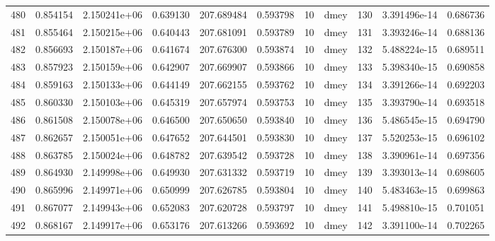 \begin{tabular}{lrrrrrrlrrr}
480  &    0.854154 &        2.150241e+06 &  0.639130 &              207.689484 &    0.593798 &      10 &         dmey &    130 &   3.391496e-14 &      0.686736 \\
481  &    0.855464 &        2.150215e+06 &  0.640443 &              207.681091 &    0.593789 &      10 &         dmey &    131 &   3.393246e-14 &      0.688136 \\
482  &    0.856693 &        2.150187e+06 &  0.641674 &              207.676300 &    0.593874 &      10 &         dmey &    132 &   5.488224e-15 &      0.689511 \\
483  &    0.857923 &        2.150159e+06 &  0.642907 &              207.669907 &    0.593866 &      10 &         dmey &    133 &   5.398340e-15 &      0.690858 \\
484  &    0.859163 &        2.150133e+06 &  0.644149 &              207.662155 &    0.593762 &      10 &         dmey &    134 &   3.391266e-14 &      0.692203 \\
485  &    0.860330 &        2.150103e+06 &  0.645319 &              207.657974 &    0.593753 &      10 &         dmey &    135 &   3.393790e-14 &      0.693518 \\
486  &    0.861508 &        2.150078e+06 &  0.646500 &              207.650650 &    0.593840 &      10 &         dmey &    136 &   5.486545e-15 &      0.694790 \\
487  &    0.862657 &        2.150051e+06 &  0.647652 &              207.644501 &    0.593830 &      10 &         dmey &    137 &   5.520253e-15 &      0.696102 \\
488  &    0.863785 &        2.150024e+06 &  0.648782 &              207.639542 &    0.593728 &      10 &         dmey &    138 &   3.390961e-14 &      0.697356 \\
489  &    0.864930 &        2.149998e+06 &  0.649930 &              207.631332 &    0.593719 &      10 &         dmey &    139 &   3.393013e-14 &      0.698605 \\
490  &    0.865996 &        2.149971e+06 &  0.650999 &              207.626785 &    0.593804 &      10 &         dmey &    140 &   5.483463e-15 &      0.699863 \\
491  &    0.867077 &        2.149943e+06 &  0.652083 &              207.620728 &    0.593797 &      10 &         dmey &    141 &   5.498810e-15 &      0.701051 \\
492  &    0.868167 &        2.149917e+06 &  0.653176 &              207.613266 &    0.593692 &      10 &         dmey &    142 &   3.391100e-14 &      0.702265 \\

\end{tabular}
